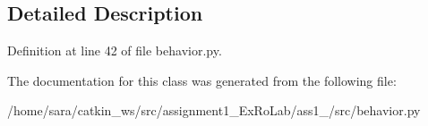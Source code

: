 \subsection{Detailed Description}


Definition at line 42 of file behavior.\+py.



The documentation for this class was generated from the following file\+:\begin{DoxyCompactItemize}
\item 
/home/sara/catkin\+\_\+ws/src/assignment1\+\_\+\+Ex\+Ro\+Lab/ass1\+\_/src/behavior.\+py\end{DoxyCompactItemize}
